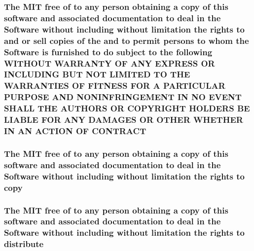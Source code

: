 \subsubsection[{C\+O\+N\+T\+R\+A\+C\+T}]{\setlength{\rightskip}{0pt plus 5cm}The M\+I\+T free of to any person obtaining a {\bf copy} of this software and associated documentation to deal in the {\bf Software} without including without limitation the rights to and or sell copies of the and to permit persons to whom the {\bf Software} is furnished to do subject to the following W\+I\+T\+H\+O\+U\+T W\+A\+R\+R\+A\+N\+T\+Y O\+F A\+N\+Y E\+X\+P\+R\+E\+S\+S O\+R I\+N\+C\+L\+U\+D\+I\+N\+G B\+U\+T N\+O\+T L\+I\+M\+I\+T\+E\+D T\+O T\+H\+E W\+A\+R\+R\+A\+N\+T\+I\+E\+S O\+F F\+I\+T\+N\+E\+S\+S F\+O\+R A P\+A\+R\+T\+I\+C\+U\+L\+A\+R P\+U\+R\+P\+O\+S\+E A\+N\+D N\+O\+N\+I\+N\+F\+R\+I\+N\+G\+E\+M\+E\+N\+T I\+N N\+O E\+V\+E\+N\+T S\+H\+A\+L\+L T\+H\+E A\+U\+T\+H\+O\+R\+S O\+R C\+O\+P\+Y\+R\+I\+G\+H\+T H\+O\+L\+D\+E\+R\+S B\+E L\+I\+A\+B\+L\+E F\+O\+R A\+N\+Y D\+A\+M\+A\+G\+E\+S O\+R O\+T\+H\+E\+R W\+H\+E\+T\+H\+E\+R I\+N A\+N A\+C\+T\+I\+O\+N O\+F C\+O\+N\+T\+R\+A\+C\+T}\label{license_8txt_a808df707d490e1041f54a1d24fbbfaa0}
\hypertarget{license_8txt_aff1d4c6b756ebf691fa44a0904f68658}{}
\subsubsection[{copy}]{\setlength{\rightskip}{0pt plus 5cm}The M\+I\+T free of to any person obtaining a copy of this software and associated documentation to deal in the {\bf Software} without including without limitation the rights to copy}\label{license_8txt_aff1d4c6b756ebf691fa44a0904f68658}
\hypertarget{license_8txt_ad8444ae07f9fa7b3e3e0cf4dc4551114}{}
\subsubsection[{distribute}]{\setlength{\rightskip}{0pt plus 5cm}The M\+I\+T free of to any person obtaining a {\bf copy} of this software and associated documentation to deal in the {\bf Software} without including without limitation the rights to distribute}\label{license_8txt_ad8444ae07f9fa7b3e3e0cf4dc4551114}
\hypertarget{license_8txt_ac44d0f7742875ad0d1fc3a6de1ee0f7d}{}
